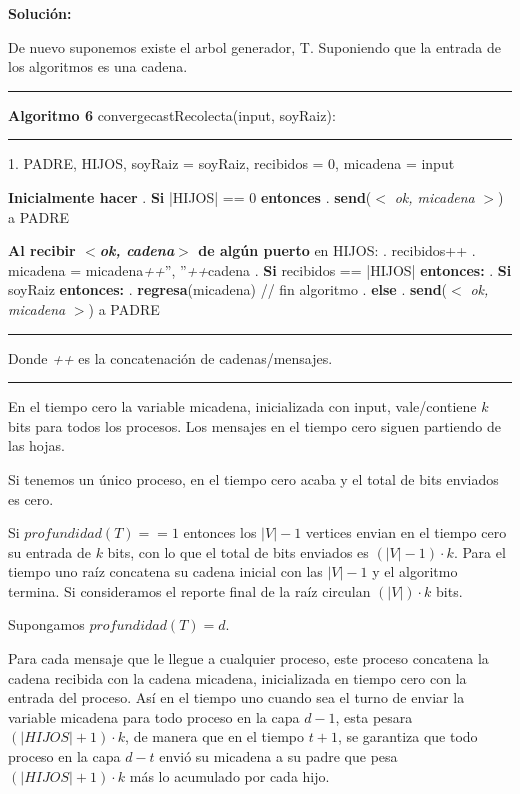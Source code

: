 \documentclass[8pt, letterpaper]{article}
\begin{document}
\begin{enumerate}
  \hfill\break
  \ttfamily
  {\bf Solución:}

  De nuevo suponemos existe el arbol generador, T. Suponiendo que la entrada
  de los algoritmos es una cadena.
  
  \rule{1\textwidth}{0.2mm}
  {\bf Algoritmo 6} convergecastRecolecta(input, soyRaiz):
  \hfill\break
  \rule{1\textwidth}{0.2mm}
  1. PADRE, HIJOS, soyRaiz = soyRaiz, recibidos = 0, micadena = input
  
  \hfill\break
  \hspace*{.2cm} {\bf Inicialmente hacer}
  \hfill{}. {\bf Si} |HIJOS| == 0 {\bf entonces}
  \hfill{}. \hspace{0.5cm} {\bf send}($<$ \textit{ok, micadena} $>$) a PADRE
  \hfill\break
  
  \hspace{0.2cm} {\bf Al recibir $<${\it ok, cadena}$>$ de algún puerto}
  en HIJOS:
  \hfill{}. recibidos++
  \hfill{}. micadena = micadena{\it ++}'', ''{\it ++}cadena
  \hfill{}. {\bf Si} recibidos == |HIJOS| {\bf entonces:}
  \hfill{}. \hspace{0.5cm} {\bf Si} soyRaiz {\bf entonces:}
  \hfill{}. \hspace{1cm} {\bf regresa}(micadena) // fin algoritmo
  \hfill{}. \hspace{0.5cm} {\bf else}
  \hfill{}. \hspace{1cm} {\bf send}($<$ \textit{ok, micadena} $>$) a PADRE
  \hfill\break
  \rule{1\textwidth}{0.2mm}
  Donde {\it ++} es la concatenación de cadenas/mensajes.
  \hfill\break
  \rule{1\textwidth}{0.2mm}

  En el tiempo cero la variable micadena, inicializada con input, vale/contiene
  $k$ bits para todos los procesos. Los mensajes en el tiempo cero siguen partiendo de las hojas.

  Si tenemos un único proceso, en el tiempo cero acaba y el total de bits
  enviados es cero. 

  Si $profundidad(T)==1$ entonces los $|V|-1$ vertices envian en el tiempo
  cero su entrada de $k$ bits, con lo que el total de bits enviados es
  $(|V|-1)\cdot k$. Para el tiempo uno raíz concatena su cadena inicial con
  las $|V|-1$ y el algoritmo termina. Si consideramos el reporte final de
  la raíz circulan $(|V|)\cdot k$ bits.

  Supongamos $profundidad(T)=d$.
  
  Para cada mensaje que le llegue a cualquier proceso, este proceso concatena
  la cadena recibida con la cadena micadena, inicializada en tiempo cero con la
  entrada del proceso.
  Así en el tiempo uno cuando sea el turno de enviar la variable micadena
  para todo proceso en la capa $d-1$, esta pesara $(|HIJOS|+1)\cdot k$, de
  manera que en el tiempo $t+1$, se garantiza que todo proceso en la capa
  $d-t$ envió su micadena a su padre que pesa $(|HIJOS|+1)\cdot k$ más lo
  acumulado por cada hijo. 


\end{enumerate}
\end{document}
